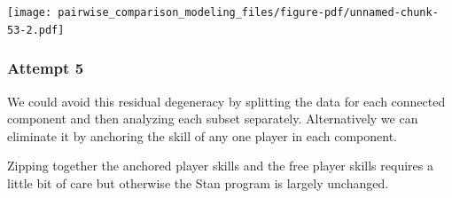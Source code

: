 \documentclass[
  letterpaper,
  DIV=11,
  numbers=noendperiod]{scrartcl}
\newenvironment{Shaded}{\begin{snugshade}}{\end{snugshade}}
\newcommand{\DecValTok}[1]{\textcolor[rgb]{0.68,0.00,0.00}{#1}}
\newcommand{\FunctionTok}[1]{\textcolor[rgb]{0.28,0.35,0.67}{#1}}
\newcommand{\NormalTok}[1]{\textcolor[rgb]{0.00,0.23,0.31}{#1}}
\newcommand{\OtherTok}[1]{\textcolor[rgb]{0.00,0.23,0.31}{#1}}
\newcommand{\SpecialCharTok}[1]{\textcolor[rgb]{0.37,0.37,0.37}{#1}}
\begin{document}
\texttt{[image: pairwise\_comparison\_modeling\_files/figure-pdf/unnamed-chunk-53-2.pdf]}

\subsubsection{Attempt 5}\label{attempt-5}

We could avoid this residual degeneracy by splitting the data for each
connected component and then analyzing each subset separately.
Alternatively we can eliminate it by anchoring the skill of any one
player in each component.

\begin{Shaded}
\end{Shaded}

Zipping together the anchored player skills and the free player skills
requires a little bit of care but otherwise the Stan program is largely
unchanged.
\end{document}

